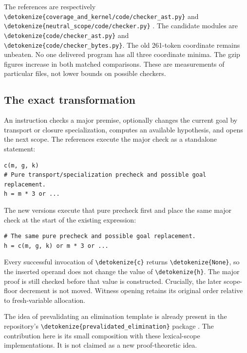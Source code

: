\documentclass[11pt,letterpaper]{article}
\theoremstyle{definition}
\theoremstyle{remark}
\newcommand{\file}[1]{\expandafter\nolinkurl\expandafter{\detokenize{#1}}}
\begin{document}
The references are respectively
\file{coverage_and_kernel/code/checker_ast.py} and
\file{neutral_scope/code/checker.py} \cite{coverage,scope}.
The candidate modules are \file{code/checker_ast.py} and
\file{code/checker_bytes.py}. The old 261-token coordinate remains
unbeaten. No one delivered program has all three coordinate minima.
The gzip figures increase in both matched comparisons. These are
measurements of particular files, not lower bounds on possible checkers.

\subsection{The exact transformation}

An instruction checks a major premise, optionally changes the current goal
by transport or closure specialization, computes an available hypothesis,
and opens the next scope. The references execute the major check as a
standalone statement:
\begin{lstlisting}
c(m, g, k)
# Pure transport/specialization precheck and possible goal replacement.
h = m * 3 or ...
\end{lstlisting}
The new versions execute that pure precheck first and place the same major
check at the start of the existing expression:
\begin{lstlisting}
# The same pure precheck and possible goal replacement.
h = c(m, g, k) or m * 3 or ...
\end{lstlisting}
Every successful invocation of \file{c} returns \file{None}, so the inserted
operand does not change the value of \file{h}. The major proof is still
checked before that value is constructed. Crucially, the later scope-floor
decrement is not moved. Witness opening retains its original order relative
to fresh-variable allocation.

The idea of prevalidating an elimination template is already present in the
repository's \file{prevalidated_elimination} package \cite{prevalidate}.
The contribution here is its small composition with these lexical-scope
implementations. It is not claimed as a new proof-theoretic idea.
\end{document}
